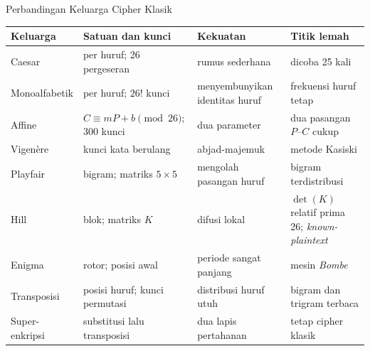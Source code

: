 \documentclass[aspectratio=169,11pt]{beamer}
\begin{document}
\begin{frame}{Perbandingan Keluarga Cipher Klasik}
    \scriptsize
    \renewcommand{\arraystretch}{0.94}
    \begin{tabularx}{\linewidth}{@{}>{\raggedright\arraybackslash}p{1.8cm} >{\raggedright\arraybackslash}p{3.3cm} >{\raggedright\arraybackslash}p{3.4cm} >{\raggedright\arraybackslash}X@{}}
        \toprule
        \textbf{Keluarga} & \textbf{Satuan dan kunci} & \textbf{Kekuatan} & \textbf{Titik lemah} \\
        \midrule
        Caesar & per huruf; 26 pergeseran & rumus sederhana & dicoba 25 kali \\
        \addlinespace[0pt]
        Monoalfabetik & per huruf; $26!$ kunci & menyembunyikan identitas huruf & frekuensi huruf tetap \\
        \addlinespace[0pt]
        Affine & $C \equiv mP+b \pmod{26}$; 300 kunci & dua parameter & dua pasangan $P$--$C$ cukup \\
        \addlinespace[0pt]
        Vigen\`ere & kunci kata berulang & abjad-majemuk & metode Kasiski \\
        \addlinespace[0pt]
        Playfair & bigram; matriks $5\times5$ & mengolah pasangan huruf & 676 bigram terdistribusi \\
        \addlinespace[0pt]
        Hill & blok; matriks $K$ & difusi lokal & $\det(K)$ relatif prima 26; \textit{known-plaintext} \\
        \addlinespace[0pt]
        Enigma & rotor; posisi awal & periode sangat panjang & mesin \textit{Bombe} \\
        \addlinespace[0pt]
        Transposisi & posisi huruf; kunci permutasi & distribusi huruf utuh & bigram dan trigram terbaca \\
        \addlinespace[0pt]
        Super-enkripsi & substitusi lalu transposisi & dua lapis pertahanan & tetap cipher klasik \\
        \bottomrule
    \end{tabularx}
\end{frame}
\end{document}
